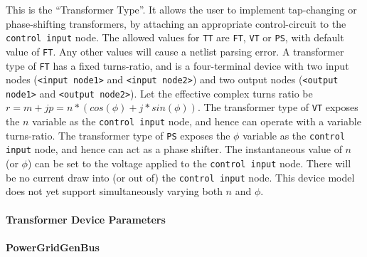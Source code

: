 \begin{Device}
\begin{Parameters}
This is the ``Transformer Type''. It allows the user to implement tap-changing
or phase-shifting transformers, by attaching an appropriate control-circuit to the 
\texttt{control input} node.  The allowed values for \texttt{TT} are \texttt{FT}, 
\texttt{VT} or \texttt{PS}, with default value of \texttt{FT}.  Any other values
will cause a netlist parsing error.  A transformer type of \texttt{FT} has a 
fixed turns-ratio, and is a four-terminal device with
two input nodes (\texttt{<input node1>} and \texttt{<input node2>}) and two output
nodes (\texttt{<output node1>} and \texttt{<output node2>}). Let the effective complex 
turns ratio be $r = m + jp = n*(cos(\phi) + j*sin(\phi))$.  The transformer type of
\texttt{VT} exposes the $n$ variable as the \texttt{control input} node, and hence can
operate with a variable turns-ratio. The  transformer type of \texttt{PS} exposes the 
$\phi$ variable as the \texttt{control input} node, and hence can act as a phase shifter. 
The instantaneous value of $n$ (or $\phi$) can be set to the voltage applied to the 
\texttt{control input} node.  There will be no current draw into (or out of) the
\texttt{control input} node.  This device model does not yet support simultaneously
varying both $n$ and $\phi$.
\end{Parameters}
\end{Device}

\paragraph{Transformer Device Parameters}




\paragraph{PowerGridGenBus}

